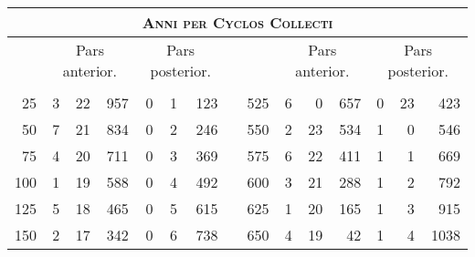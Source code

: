 %
\begin{tabnums} %
\footnotesize
\centering
\setlength{\tabcolsep}{1.0ex}
%
\newcommand{\cwd}{3.2em}
\newcommand{\da}{{\tiny †}}
\newcommand{\db}{{\scriptsize o}}
\newcommand{\ang}{90}
\newcommand{\hsb}[1]{\footnotesize{#1}}
\newcommand{\hsa}[1]{\tiny{#1}}
%
\newcommand{\hdrB}{%
  ~ &
  \multicolumn{3}{c}{\hsb{Pars anterior.}} &
  \multicolumn{3}{c}{\hsb{Pars posterior.}}  
}
%
\newcommand{\hdrA}{%
  \ch{\hsa{Anni per}}{\hsa{Anni per cyclos collecti.}} &
  \ch{\hsa{Feria.}}{\hsa{Feria.}}&
  \ch{\hsa{Hor.}}{\hsa{Hor.}} &
  \ch{\hsa{Scrup.}}{\hsa{Scrup.}} &
  \ch{\hsa{Dies.}}{\hsa{Dies.}} &
  \ch{\hsa{Hor.}}{\hsa{Hor.}} &
  \ch{\hsa{Scrup.}}{\hsa{Scrup.}}
}
%
\newcommand{\hdrs}{%
\hdrB && \hdrB\\
\cmidrule(lr){2-4} \cmidrule(lr){5-7} \cmidrule(lr){10-12} \cmidrule(lr){13-15}
\hdrA && \hdrA\\
}
%
\begin{tabular}[c]{@{} r rrr rrr c r rrr rrr @{}}
\toprule
\multicolumn{15}{c}{\Large\textsc{Anni per Cyclos Collecti}} \\
\toprule
\hdrs %
\midrule
  25 & 3 & 22 &  957 & 0 &  1 &  123 &&  525 & 6 &  0 &  657 & 0 & 23 &  423 \\
  50 & 7 & 21 &  834 & 0 &  2 &  246 &&  550 & 2 & 23 &  534 & 1 &  0 &  546 \\
  75 & 4 & 20 &  711 & 0 &  3 &  369 &&  575 & 6 & 22 &  411 & 1 &  1 &  669 \\
 100 & 1 & 19 &  588 & 0 &  4 &  492 &&  600 & 3 & 21 &  288 & 1 &  2 &  792 \\
 125 & 5 & 18 &  465 & 0 &  5 &  615 &&  625 & 1 & 20 &  165 & 1 &  3 &  915 \\
 150 & 2 & 17 &  342 & 0 &  6 &  738 &&  650 & 4 & 19 &   42 & 1 &  4 & 1038 \\

\end{tabular}
\end{tabnums}

